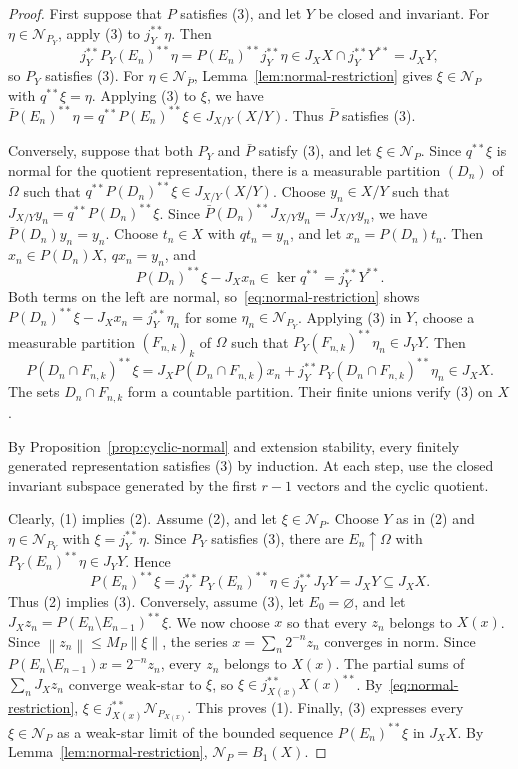 \documentclass[11pt,leqno]{amsart}
\theoremstyle{compact}
\numberwithin{equation}{section}
\theoremstyle{compactremark}
\theoremstyle{compact}
\newcommand{\1}{\mathbbm{1}}
\newcommand{\norm}[1]{\left\|#1\right\|}
\begin{document}
\begin{proof}
\begingroup
First suppose that $P$ satisfies (3), and let $Y$ be closed and invariant. For $\eta\in\mathcal N_{P_Y}$, apply (3) to $j_Y^{**}\eta$. Then
\[
j_Y^{**}P_Y(E_n)^{**}\eta=P(E_n)^{**}j_Y^{**}\eta\in J_XX\cap j_Y^{**}Y^{**}=J_XY,
\]
so $P_Y$ satisfies (3). For $\eta\in\mathcal N_{\bar P}$, Lemma~\ref{lem:normal-restriction} gives $\xi\in\mathcal N_P$ with $q^{**}\xi=\eta$. Applying (3) to $\xi$, we have $\bar P(E_n)^{**}\eta=q^{**}P(E_n)^{**}\xi\in J_{X/Y}(X/Y)$. Thus $\bar P$ satisfies (3).

Conversely, suppose that both $P_Y$ and $\bar P$ satisfy (3), and let $\xi\in\mathcal N_P$.
\endgroup
Since $q^{**}\xi$ is normal for the quotient representation, there is a measurable partition $(D_n)$ of $\Omega$ such that $q^{**}P(D_n)^{**}\xi\in J_{X/Y}(X/Y)$. Choose $y_n\in X/Y$ such that $J_{X/Y}y_n=q^{**}P(D_n)^{**}\xi$. Since $\bar P(D_n)^{**}J_{X/Y}y_n=J_{X/Y}y_n$, we have $\bar P(D_n)y_n=y_n$. Choose $t_n\in X$ with $qt_n=y_n$, and let $x_n=P(D_n)t_n$. Then $x_n\in P(D_n)X$, $qx_n=y_n$, and
\[
P(D_n)^{**}\xi-J_Xx_n\in\ker q^{**}=j_Y^{**}Y^{**}.
\]
Both terms on the left are normal, so~\eqref{eq:normal-restriction} shows $P(D_n)^{**}\xi-J_Xx_n=j_Y^{**}\eta_n$ for some $\eta_n\in\mathcal N_{P_Y}$. Applying (3) in $Y$, choose a measurable partition $(F_{n,k})_k$ of $\Omega$ such that $P_Y(F_{n,k})^{**}\eta_n\in J_YY$. Then
\[
P(D_n\cap F_{n,k})^{**}\xi
=J_XP(D_n\cap F_{n,k})x_n+j_Y^{**}P_Y(D_n\cap F_{n,k})^{**}\eta_n\in J_XX.
\]
The sets $D_n\cap F_{n,k}$ form a countable partition. Their finite unions verify (3) on $X$.

By Proposition~\ref{prop:cyclic-normal} and extension stability, every finitely generated representation satisfies (3) by induction. At each step, use the closed invariant subspace generated by the first $r-1$ vectors and the cyclic quotient.

Clearly, (1) implies (2). Assume (2), and let $\xi\in\mathcal N_P$. Choose $Y$ as in (2) and $\eta\in\mathcal N_{P_Y}$ with $\xi=j_Y^{**}\eta$. Since $P_Y$ satisfies (3), there are $E_n\uparrow\Omega$ with $P_Y(E_n)^{**}\eta\in J_YY$. Hence
\[
P(E_n)^{**}\xi=j_Y^{**}P_Y(E_n)^{**}\eta\in j_Y^{**}J_YY=J_XY\subseteq J_XX.
\]
Thus (2) implies (3). Conversely, assume (3), let $E_0=\varnothing$, and let $J_Xz_n=P(E_n\setminus E_{n-1})^{**}\xi$. We now choose $x$ so that every $z_n$ belongs to $X(x)$. Since $\norm{z_n}\leq M_P\norm{\xi}$, the series $x=\sum_n2^{-n}z_n$ converges in norm. Since $P(E_n\setminus E_{n-1})x=2^{-n}z_n$, every $z_n$ belongs to $X(x)$. The partial sums of $\sum_nJ_Xz_n$ converge weak-star to $\xi$, so $\xi\in j_{X(x)}^{**}X(x)^{**}$. By~\eqref{eq:normal-restriction}, $\xi\in j_{X(x)}^{**}\mathcal N_{P_{X(x)}}$. This proves (1). Finally, (3) expresses every $\xi\in \mathcal N_P$ as a weak-star limit of the bounded sequence $P(E_n)^{**}\xi$ in $J_XX$. By Lemma~\ref{lem:normal-restriction}, $\mathcal N_P=B_1(X)$.
\end{proof}
\end{document}

